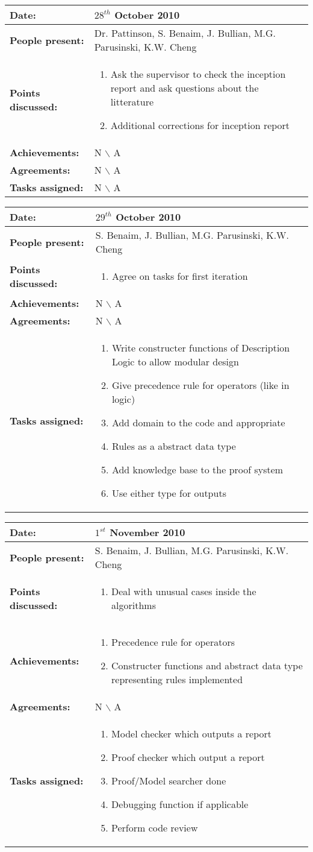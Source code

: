 \documentclass[12pt,a4paper]{article}
\newcommand{\meeting}[6]{%
\begin{center}%
\begin{longtable}{| p{3.5cm} | | p{13cm} |}%
\hline%
\textbf{Date:} & #1 \\%
\hline%
\textbf{People present:} &#2 \\%
\hline%
\textbf{Points discussed:} &#3\\%
\hline%
\textbf{Achievements:} &#4 \\%
\hline%
\textbf{Agreements:} &#5 \\%
\hline%
\textbf{Tasks assigned:} &#6  \\%
\hline%
\end{longtable}%
\end{center}%
\bigbreak
}
\begin{document}
\meeting{$28^{th}$ October 2010}%
{Dr. Pattinson, S. Benaim, J. Bullian, M.G. Parusinski, K.W. Cheng}%
{ \begin{enumerate} 
\item Ask the supervisor to check the inception report and ask questions about the litterature
\item Additional corrections for inception report
\end{enumerate} }%
{ N $\backslash$ A}%
{N $\backslash$ A}
{N $\backslash$ A}%

\meeting{$29^{th}$ October 2010}%
{S. Benaim, J. Bullian, M.G. Parusinski, K.W. Cheng}%
{ \begin{enumerate} 
\item Agree on tasks for first iteration
\end{enumerate} }%
{ N $\backslash$ A}%
{N $\backslash$ A}
{\begin{enumerate}
\item Write constructer functions of Description Logic to allow modular design
\item Give precedence rule for operators (like in logic)
\item Add domain to the code and appropriate
\item Rules as a abstract data type
\item Add knowledge base to the proof system
\item Use either type for outputs
\end{enumerate}}%

\meeting{$1^{st}$ November 2010}%
{S. Benaim, J. Bullian, M.G. Parusinski, K.W. Cheng}%
{\begin{enumerate} 
\item  Deal with unusual cases inside the algorithms
\end{enumerate} }%
{\begin{enumerate}
\item Precedence rule for operators
\item Constructer functions and abstract data type representing rules implemented
\end{enumerate}}%
{N $\backslash$ A}
{\begin{enumerate}
\item Model checker which outputs a report
\item Proof checker which output a report
\item Proof/Model searcher done
\item Debugging function if applicable
\item Perform code review
\end{enumerate}}%
\end{document}
